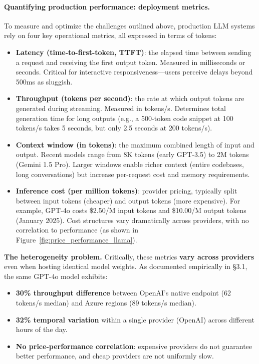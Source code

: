 \documentclass[english]{article}
\begin{document}
\paragraph{Quantifying production performance: deployment metrics.}

To measure and optimize the challenges outlined above, production LLM systems rely on four key operational metrics, all expressed in terms of tokens:

\begin{itemize}
    \item \textbf{Latency (time-to-first-token, TTFT)}: the elapsed time between sending a request and receiving the first output token. Measured in milliseconds or seconds. Critical for interactive responsiveness—users perceive delays beyond 500ms as sluggish.

    \item \textbf{Throughput (tokens per second)}: the rate at which output tokens are generated during streaming. Measured in tokens/s. Determines total generation time for long outputs (e.g., a 500-token code snippet at 100 tokens/s takes 5 seconds, but only 2.5 seconds at 200 tokens/s).

    \item \textbf{Context window (in tokens)}: the maximum combined length of input and output. Recent models range from 8K tokens (early GPT-3.5) to 2M tokens (Gemini 1.5 Pro). Larger windows enable richer context (entire codebases, long conversations) but increase per-request cost and memory requirements.

    \item \textbf{Inference cost (per million tokens)}: provider pricing, typically split between input tokens (cheaper) and output tokens (more expensive). For example, GPT-4o costs \$2.50/M input tokens and \$10.00/M output tokens (January 2025). Cost structures vary dramatically across providers, with no correlation to performance (as shown in Figure~\ref{fig:price_performance_llama}).
\end{itemize}

\medskip

\noindent\textbf{The heterogeneity problem.}
Critically, these metrics \textbf{vary across providers} even when hosting identical model weights. As documented empirically in §3.1, the same GPT-4o model exhibits:
\begin{itemize}
    \item \textbf{30\% throughput difference} between OpenAI's native endpoint (62 tokens/s median) and Azure regions (89 tokens/s median).
    \item \textbf{32\% temporal variation} within a single provider (OpenAI) across different hours of the day.
    \item \textbf{No price-performance correlation}: expensive providers do not guarantee better performance, and cheap providers are not uniformly slow.
\end{itemize}
\end{document}

